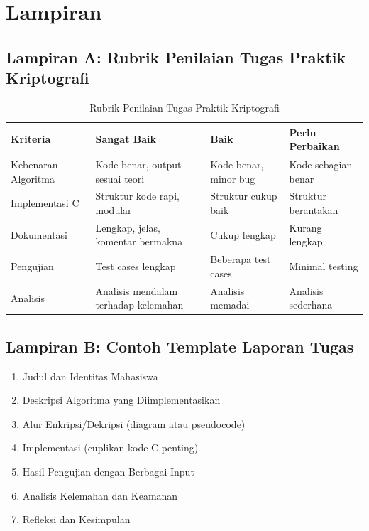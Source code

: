 \documentclass[main.tex]{subfiles}
\begin{document}
\chapter*{Lampiran}

\section*{Lampiran A: Rubrik Penilaian Tugas Praktik Kriptografi}

\begin{table}[htbp]
\centering
\small
\begin{tabular}{|>{\raggedright\arraybackslash}p{3cm}|>{\raggedright\arraybackslash}p{3.5cm}|>{\raggedright\arraybackslash}p{3.5cm}|>{\raggedright\arraybackslash}p{3.5cm}|}
\hline
\textbf{Kriteria} & \textbf{Sangat Baik} & \textbf{Baik} & \textbf{Perlu Perbaikan} \\
\hline
Kebenaran Algoritma & Kode benar, output sesuai teori & Kode benar, minor bug & Kode sebagian benar \\
\hline
Implementasi C & Struktur kode rapi, modular & Struktur cukup baik & Struktur berantakan \\
\hline
Dokumentasi & Lengkap, jelas, komentar bermakna & Cukup lengkap & Kurang lengkap \\
\hline
Pengujian & Test cases lengkap & Beberapa test cases & Minimal testing \\
\hline
Analisis & Analisis mendalam terhadap kelemahan & Analisis memadai & Analisis sederhana \\
\hline
\end{tabular}
\caption{Rubrik Penilaian Tugas Praktik Kriptografi}
\end{table}

\section*{Lampiran B: Contoh Template Laporan Tugas}
\begin{enumerate}
  \item Judul dan Identitas Mahasiswa
  \item Deskripsi Algoritma yang Diimplementasikan
  \item Alur Enkripsi/Dekripsi (diagram atau pseudocode)
  \item Implementasi (cuplikan kode C penting)
  \item Hasil Pengujian dengan Berbagai Input
  \item Analisis Kelemahan dan Keamanan
  \item Refleksi dan Kesimpulan
\end{enumerate}
\end{document}
